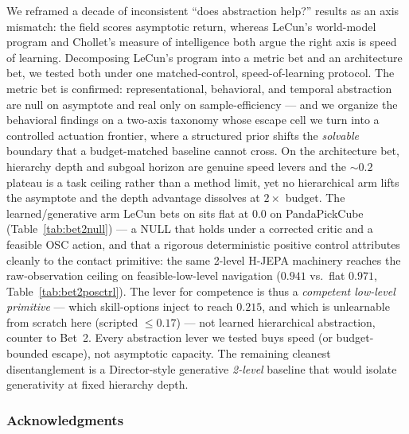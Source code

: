 \documentclass{article}
\newcommand{\todo}[1]{\textcolor{red}{\textbf{[TODO: #1]}}}
\begin{document}
We reframed a decade of inconsistent ``does abstraction help?'' results as an
axis mismatch: the field scores asymptotic return, whereas LeCun's world-model
program and Chollet's measure of intelligence both argue the right axis is speed
of learning. Decomposing LeCun's program into a metric bet and an architecture
bet, we tested both under one matched-control, speed-of-learning protocol. The
metric bet is confirmed: representational, behavioral, and temporal abstraction
are null on asymptote and real only on sample-efficiency --- and we organize the
behavioral findings on a two-axis taxonomy whose escape cell we turn into a
controlled actuation frontier, where a structured prior shifts the \emph{solvable}
boundary that a budget-matched baseline cannot cross. On the architecture bet,
hierarchy depth and subgoal horizon are genuine speed levers and the ${\sim}0.2$
plateau is a task ceiling rather than a method limit, yet no hierarchical arm lifts
the asymptote and the depth advantage dissolves at $2\times$ budget. The
learned/generative arm LeCun bets on sits flat at $0.0$ on PandaPickCube
(Table~\ref{tab:bet2null}) --- a NULL that holds under a corrected critic and a
feasible OSC action, and that a rigorous deterministic positive control attributes
cleanly to the contact primitive: the same 2-level H-JEPA machinery reaches the
raw-observation ceiling on feasible-low-level navigation ($0.941$ vs.\ flat
$0.971$, Table~\ref{tab:bet2posctrl}). The lever for competence is thus a
\emph{competent low-level primitive} --- which skill-options inject to reach
$0.215$, and which is unlearnable from scratch here (scripted ${\leq}0.17$) --- not
learned hierarchical abstraction, counter to Bet~2. Every abstraction lever we
tested buys speed (or budget-bounded escape), not asymptotic capacity. The
remaining cleanest disentanglement is a Director-style generative \emph{2-level}
baseline that would isolate generativity at fixed hierarchy depth.

\subsubsection*{Acknowledgments}



\end{document}
